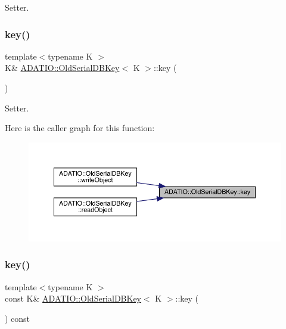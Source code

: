 Setter. 

\mbox{\label{classADATIO_1_1OldSerialDBKey_ab191c26e658125d7ac4378c8b74d6f1b}} 
\subsubsection{\texorpdfstring{key()}{key()}\hspace{0.1cm}{\footnotesize\ttfamily [3/6]}}
{\footnotesize\ttfamily template$<$typename K $>$ \\
K\& \mbox{\hyperlink{classADATIO_1_1OldSerialDBKey}{A\+D\+A\+T\+I\+O\+::\+Old\+Serial\+D\+B\+Key}}$<$ K $>$\+::key (\begin{DoxyParamCaption}{ }\end{DoxyParamCaption})\hspace{0.3cm}{\ttfamily [inline]}}



Setter. 

Here is the caller graph for this function\+:
\nopagebreak
\begin{figure}[H]
\begin{center}
\leavevmode
\includegraphics[width=350pt]{dc/d7d/classADATIO_1_1OldSerialDBKey_ab191c26e658125d7ac4378c8b74d6f1b_icgraph}
\end{center}
\end{figure}
\mbox{\label{classADATIO_1_1OldSerialDBKey_a10d8c5351439c43bacb5e365750e7b1d}} 
\subsubsection{\texorpdfstring{key()}{key()}\hspace{0.1cm}{\footnotesize\ttfamily [4/6]}}
{\footnotesize\ttfamily template$<$typename K $>$ \\
const K\& \mbox{\hyperlink{classADATIO_1_1OldSerialDBKey}{A\+D\+A\+T\+I\+O\+::\+Old\+Serial\+D\+B\+Key}}$<$ K $>$\+::key (\begin{DoxyParamCaption}{ }\end{DoxyParamCaption}) const\hspace{0.3cm}{\ttfamily [inline]}}



